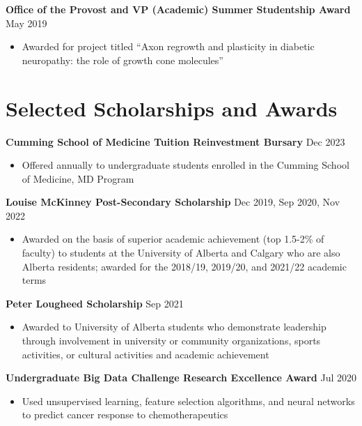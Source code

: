 \documentclass{article}
\begin{document}
\textbf{Office of the Provost and VP (Academic) Summer Studentship Award} \hfill May 2019
\begin{itemize}
    \item Awarded for project titled ``Axon regrowth and plasticity in diabetic neuropathy: the role of growth cone molecules''
\end{itemize}


\section*{\textcolor{my_colour}{Selected Scholarships and Awards} }
\vspace{-.25em} \hrulefill \vspace{.25em}

\textbf{Cumming School of Medicine Tuition Reinvestment Bursary} \hfill Dec 2023
\begin{itemize}
    \item Offered annually to undergraduate students enrolled in the Cumming School of Medicine, MD Program
\end{itemize} \vspace{1em}

\textbf{Louise McKinney Post-Secondary Scholarship} \hfill Dec 2019, Sep 2020, Nov 2022
\begin{itemize}
    \item Awarded on the basis of superior academic achievement (top 1.5-2\% of faculty) to students at the University of Alberta and Calgary who are also Alberta residents; awarded for the 2018/19, 2019/20, and 2021/22 academic terms
\end{itemize} \vspace{1em}

\textbf{Peter Lougheed Scholarship} \hfill Sep 2021
\begin{itemize}
    \item Awarded to University of Alberta students who demonstrate leadership through involvement in university or community organizations, sports activities, or cultural activities and academic achievement
\end{itemize} \vspace{1em}

\textbf{Undergraduate Big Data Challenge Research Excellence Award} \hfill Jul 2020
\begin{itemize}
    \item Used unsupervised learning, feature selection algorithms, and neural networks to predict cancer response to chemotherapeutics
\end{itemize} \vspace{1em}
\end{document}
